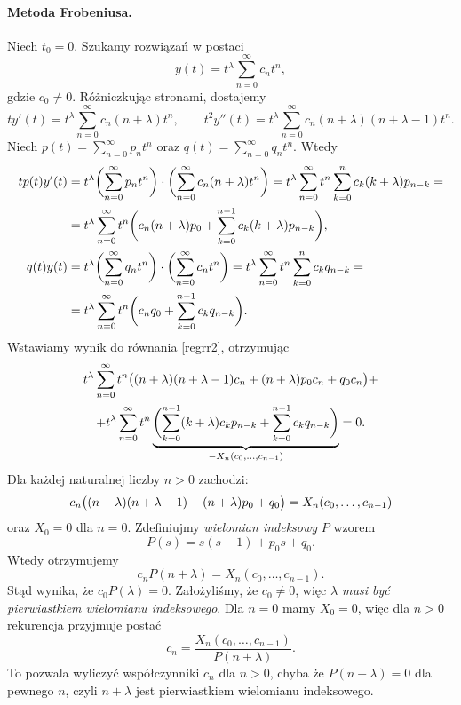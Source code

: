 \paragraph{Metoda Frobeniusa.} Niech $t_0 = 0$. Szukamy rozwiązań w postaci
%
\begin{equation*}
  y(t) = t^{\lambda} \sum_{n=0}^{\infty} c_n t^n,
\end{equation*}
%
gdzie $c_0 \not= 0$. Różniczkując stronami, dostajemy
%
\begin{equation*}
  t y'(t) = t^{\lambda} \sum_{n=0}^{\infty} c_n (n+\lambda) t^n, \qquad
  t^2 y''(t) = t^{\lambda} \sum_{n=0}^{\infty} c_n (n+\lambda) (n+\lambda-1) t^n.
\end{equation*}
%
Niech $p(t) = \sum_{n=0}^{\infty} p_n t^n$ oraz $q(t) = \sum_{n=0}^{\infty} q_n t^n$. Wtedy
%
\begin{align*}
  t p(t) y'(t) &= t^{\lambda} \p[\bigg]{\sum_{n=0}^{\infty} p_n t^n} \cdot \p[\bigg]{\sum_{n=0}^{\infty} c_n 
  (n+\lambda) t^n}
  = t^{\lambda} \sum_{n=0}^{\infty} t^n \sum_{k=0}^n c_k (k+\lambda) p_{n-k} = \\
  &= t^{\lambda} \sum_{n=0}^{\infty} t^n \p[\bigg]{c_n (n+\lambda) p_0 + \sum_{k=0}^{n-1} c_k (k+\lambda) p_{n-k}}, \\
  q(t) y(t) &= t^{\lambda} \p[\bigg]{\sum_{n=0}^{\infty} q_n t^n} \cdot \p[\bigg]{\sum_{n=0}^{\infty} c_n t^n}
  = t^{\lambda} \sum_{n=0}^{\infty} t^n \sum_{k=0}^n c_k q_{n-k} = \\
  &= t^{\lambda} \sum_{n=0}^{\infty} t^n \p[\bigg]{c_n q_0 + \sum_{k=0}^{n-1} c_k q_{n-k}}.
\end{align*}
%
Wstawiamy wynik do równania \eqref{regrr2}, otrzymując
%
\begin{multline*}
  t^{\lambda} \sum_{n=0}^{\infty} t^n \p[\big]{(n+\lambda) (n+\lambda-1) c_n + (n+\lambda) p_0 c_n + q_0 c_n } + \\
  + t^{\lambda} \sum_{n=0}^{\infty} t^n \underbrace{\p[\bigg]{\sum_{k=0}^{n-1} (k+\lambda) c_k p_{n-k} + 
    \sum_{k=0}^{n-1} c_k q_{n-k}}}_{-X_n(c_0,\ldots,c_{n-1})} = 0.
\end{multline*}
%
Dla każdej naturalnej liczby $n > 0$ zachodzi:
\begin{equation*}
  c_n \p[\big]{(n+\lambda) (n+\lambda-1) + (n+\lambda) p_0 + q_0} = X_n(c_0,\ldots,c_{n-1})
\end{equation*}
%
oraz $X_0 = 0$ dla $n = 0$. Zdefiniujmy \emph{wielomian indeksowy} $P$ wzorem
%
\begin{equation*}
  P(s) = s(s-1) + p_0 s + q_0.
\end{equation*}
%
Wtedy otrzymujemy
%
\begin{equation*}
  c_n P(n+\lambda) = X_n(c_0,\ldots,c_{n-1}).
\end{equation*}
%
Stąd wynika, że $c_0 P(\lambda) = 0$. Założyliśmy, że $c_0 \not= 0$, więc \emph{$\lambda$ musi być pierwiastkiem 
wielomianu indeksowego}. Dla $n = 0$ mamy $X_0 = 0$, więc dla $n > 0$ rekurencja przyjmuje postać
%
\begin{equation*}
  c_n = \frac{X_n(c_0,\ldots,c_{n-1})}{P(n+\lambda)}.
\end{equation*}
%
To pozwala wyliczyć współczynniki $c_n$ dla $n > 0$, chyba że $P(n+\lambda) = 0$ dla pewnego $n$, czyli $n+\lambda$ 
jest pierwiastkiem wielomianu indeksowego.
%
